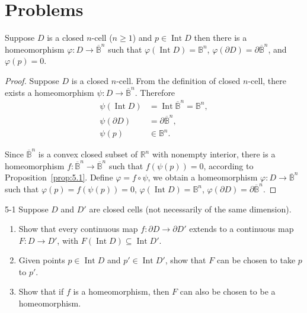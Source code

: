 \section*{Problems}

\begin{note}\label{note:closed-cell-homeomorphism}
	Suppose \( D \) is a closed \( n \)-cell (\( n\geq 1 \)) and \( p\in \operatorname{Int} D \) then there is a homeomorphism \( \varphi: D \to \overline{\mathbb{B}}^{n} \) such that \( \varphi(\operatorname{Int} D) = \mathbb{B}^{n} \), \( \varphi(\partial D) = \partial \overline{\mathbb{B}}^{n} \), and \( \varphi(p) = 0 \).
\end{note}

\begin{proof}
	Suppose \( D \) is a closed \( n \)-cell. From the definition of closed \( n \)-cell, there exists a homeomorphism \( \psi: D \to \overline{\mathbb{B}}^{n} \). Therefore
	\begin{align*}
		\psi(\operatorname{Int} D) & = \operatorname{Int} \overline{\mathbb{B}}^{n} = \mathbb{B}^{n}, \\
		\psi(\partial D)           & = \partial \overline{\mathbb{B}}^{n},                            \\
		\psi(p)                    & \in \mathbb{B}^{n}.
	\end{align*}

	Since \( \overline{\mathbb{B}}^{n} \) is a convex closed subset of \( \mathbb{R}^{n} \) with nonempty interior, there is a homeomorphism \( f: \overline{\mathbb{B}}^{n} \to \overline{\mathbb{B}}^{n} \) such that \( f(\psi(p)) = 0 \), according to Proposition~\ref{prop:5.1}. Define \( \varphi = f\circ \psi \), we obtain a homeomorphism \( \varphi: D \to \overline{\mathbb{B}}^{n} \) such that \( \varphi(p) = f(\psi(p)) = 0 \), \( \varphi(\operatorname{Int} D) = \mathbb{B}^{n} \), \( \varphi(\partial D) = \partial \overline{\mathbb{B}}^{n} \).
\end{proof}

\begin{problem}{5-1}\label{problem:5-1}
Suppose \( D \) and \( D' \) are closed cells (not necessarily of the same dimension).
\begin{enumerate}[label={(\alph*)}]
	\item Show that every continuous map \( f: \partial D \to \partial D' \) extends to a continuous map \( F: D \to D' \), with \( F(\operatorname{Int} D) \subseteq \operatorname{Int} D' \).
	\item Given points \( p \in \operatorname{Int} D \) and \( p' \in \operatorname{Int} D' \), show that \( F \) can be chosen to take \( p \) to \( p' \).
	\item Show that if \( f \) is a homeomorphism, then \( F \) can also be chosen to be a homeomorphism.
\end{enumerate}
\end{problem}

